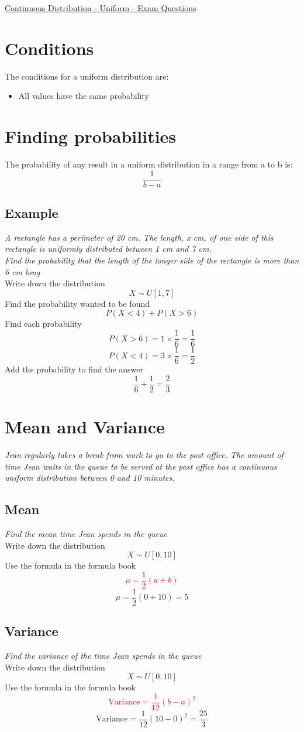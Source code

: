 \documentclass{article}[18pt]
\begin{document}
\begin{center}
\underline{\huge Continuous Distribution - Uniform - Exam Questions}
\end{center}
\section{Conditions}
The conditions for a uniform distribution are:
\begin{itemize}
\item All values have the same probability
\end{itemize}
\section{Finding probabilities}
The probability of any result in a uniform distribution in a range from a to b is:
$$\frac{1}{b-a}$$
\subsection{Example}
\textit{A rectangle has a perimeter of 20 cm. The length, x cm, of one side of this rectangle is
uniformly distributed between 1 cm and 7 cm.\\
Find the probability that the length of the longer side of the rectangle is more than 6 cm long}\\
Write down the distribution
$$X\sim U[1,7]$$
Find the probability wanted to be found
$$P(X<4)+P(X>6)$$
Find each probability
$$P(X>6)=1\times\frac{1}{6}=\frac{1}{6}$$
$$P(X<4)=3\times\frac{1}{6}=\frac{1}{2}$$
Add the probability to find the answer
$$\frac{1}{6}+\frac{1}{2}=\frac{2}{3}$$
\section{Mean and Variance}
\textit{Jean regularly takes a break from work to go to the post office. The amount of time Jean waits
in the queue to be served at the post office has a continuous uniform distribution between 0 and
10 minutes.}
\subsection{Mean}
\textit{Find the mean time Jean spends in the queue}\\
Write down the distribution
$$X\sim U[0,10]$$
Use the formula in the formula book
\textcolor{red}{$$\mu=\frac{1}{2}(a+b)$$}
$$\mu=\frac{1}{2}(0+10)=5$$
\subsection{Variance}
\textit{Find the variance of the time Jean spends in the queue}\\
Write down the distribution
$$X\sim U[0,10]$$
Use the formula in the formula book
\textcolor{red}{$$\textrm{Variance}=\frac{1}{12}(b-a)^2$$}
$$\textrm{Variance}=\frac{1}{12}(10-0)^2=\frac{25}{3}$$
\newpage
\end{document}
